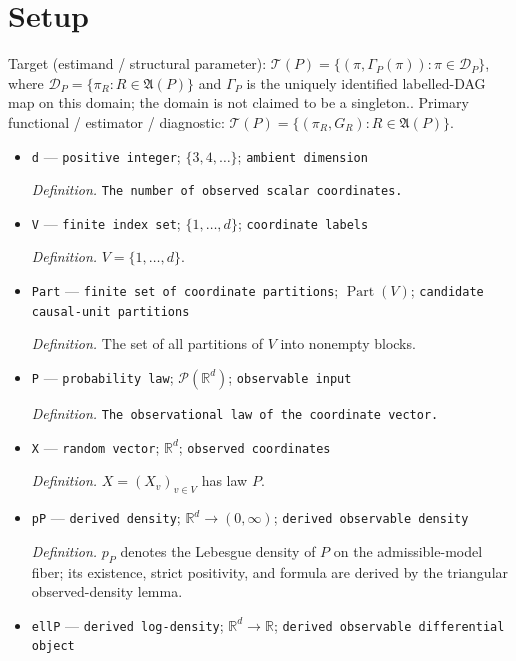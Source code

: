 \documentclass{article}
\begin{document}
\section{Setup}

Target (estimand / structural parameter): \(\mathcal T(P)=\{(\pi,\Gamma_P(\pi)):\pi\in\mathcal D_P\}\), where \(\mathcal D_P=\{\pi_R:R\in\mathfrak A(P)\}\) and \(\Gamma_P\) is the uniquely identified labelled-DAG map on this domain; the domain is not claimed to be a singleton..
Primary functional / estimator / diagnostic: \(\mathcal T(P)=\{(\pi_R,G_R):R\in\mathfrak A(P)\}\).
\begin{itemize}
  \item \texttt{d} --- \texttt{positive integer}; \(\{3,4,\ldots\}\); \texttt{ambient dimension}
  \par\smallskip\noindent\emph{Definition.} \texttt{The number of observed scalar coordinates.}
  \item \texttt{V} --- \texttt{finite index set}; \(\{1,\ldots,d\}\); \texttt{coordinate labels}
  \par\smallskip\noindent\emph{Definition.} \(V=\{1,\ldots,d\}\).
  \item \texttt{Part} --- \texttt{finite set of coordinate partitions}; \(\operatorname{Part}(V)\); \texttt{candidate causal-\allowbreak{}unit partitions}
  \par\smallskip\noindent\emph{Definition.} The set of all partitions of \(V\) into nonempty blocks.
  \item \texttt{P} --- \texttt{probability law}; \(\mathcal P(\mathbb R^d)\); \texttt{observable input}
  \par\smallskip\noindent\emph{Definition.} \texttt{The observational law of the coordinate vector.}
  \item \texttt{X} --- \texttt{random vector}; \(\mathbb R^d\); \texttt{observed coordinates}
  \par\smallskip\noindent\emph{Definition.} \(X=(X_v)_{v\in V}\) has law \(P\).
  \item \texttt{pP} --- \texttt{derived density}; \(\mathbb R^d\to(0,\infty)\); \texttt{derived observable density}
  \par\smallskip\noindent\emph{Definition.} \(p_P\) denotes the Lebesgue density of \(P\) on the admissible-model fiber; its existence, strict positivity, and formula are derived by the triangular observed-density lemma.
  \item \texttt{ellP} --- \texttt{derived log-\allowbreak{}density}; \(\mathbb R^d\to\mathbb R\); \texttt{derived observable differential object}

\end{itemize}
\end{document}

